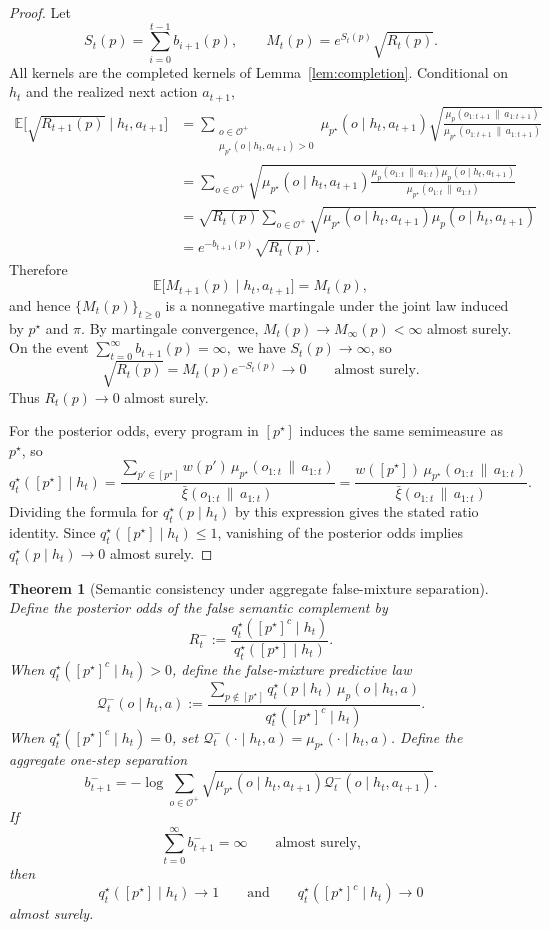\documentclass[11pt]{article}
\newtheorem{theorem}[definition]{Theorem}
\theoremstyle{remark}
\newcommand{\Ocal}{\mathcal{O}}
\newcommand{\Qcal}{\mathcal{Q}}
\newcommand{\E}{\mathbb{E}}
\newcommand{\givena}{\,\|\,}
\newcommand{\barxi}{\bar{\xi}}
\begin{document}
\begin{proof}
Let
\[
S_t(p) = \sum_{i=0}^{t-1} b_{i+1}(p),
\qquad
M_t(p) = e^{S_t(p)}\sqrt{R_t(p)}.
\]
All kernels are the completed kernels of Lemma~\ref{lem:completion}. Conditional on \(h_t\) and the realized next action \(a_{t+1}\),
\begin{align*}
\E\bigl[\sqrt{R_{t+1}(p)} \mid h_t,a_{t+1}\bigr]
&=
\sum_{\substack{o \in \Ocal^+\\
\mu_{p^\star}(o\mid h_t,a_{t+1})>0}}
\mu_{p^\star}(o\mid h_t,a_{t+1})
\sqrt{
\frac{\mu_p(o_{1:t+1}\givena a_{1:t+1})}
{\mu_{p^\star}(o_{1:t+1}\givena a_{1:t+1})}
} \\
&=
\sum_{o \in \Ocal^+}
\sqrt{
\mu_{p^\star}(o\mid h_t,a_{t+1})
\frac{
\mu_p(o_{1:t}\givena a_{1:t})
\mu_p(o\mid h_t,a_{t+1})
}{
\mu_{p^\star}(o_{1:t}\givena a_{1:t})
}
} \\
&=
\sqrt{R_t(p)}
\sum_{o \in \Ocal^+}
\sqrt{
\mu_{p^\star}(o\mid h_t,a_{t+1})
\mu_p(o\mid h_t,a_{t+1})
} \\
&=
e^{-b_{t+1}(p)}\sqrt{R_t(p)}.
\end{align*}
Therefore
\[
\E\bigl[M_{t+1}(p)\mid h_t,a_{t+1}\bigr]
= M_t(p),
\]
and hence \(\{M_t(p)\}_{t\ge0}\) is a nonnegative martingale under the joint law induced by \(p^\star\) and \(\pi\). By martingale convergence, \(M_t(p)\to M_\infty(p)<\infty\) almost surely. On the event
\(
\sum_{t=0}^{\infty} b_{t+1}(p)=\infty,
\)
we have \(S_t(p)\to\infty\), so
\[
\sqrt{R_t(p)} = M_t(p)e^{-S_t(p)} \to 0
\qquad\text{almost surely.}
\]
Thus \(R_t(p)\to 0\) almost surely.

For the posterior odds, every program in \([p^\star]\) induces the same semimeasure as \(p^\star\), so
\[
q_t^\star([p^\star]\mid h_t)
=
\frac{
\sum_{p' \in [p^\star]} w(p')\,\mu_{p^\star}(o_{1:t}\givena a_{1:t})
}{
\barxi(o_{1:t}\givena a_{1:t})
}
=
\frac{
w([p^\star])\,\mu_{p^\star}(o_{1:t}\givena a_{1:t})
}{
\barxi(o_{1:t}\givena a_{1:t})
}.
\]
Dividing the formula for \(q_t^\star(p\mid h_t)\) by this expression gives the stated ratio identity. Since \(q_t^\star([p^\star]\mid h_t)\le 1\), vanishing of the posterior odds implies \(q_t^\star(p\mid h_t)\to 0\) almost surely.
\end{proof}

\begin{theorem}[Semantic consistency under aggregate false-mixture separation]
\label{thm:semantic-consistency}
Define the posterior odds of the false semantic complement by
\[
R_t^-
:=
\frac{q_t^\star([p^\star]^c\mid h_t)}
{q_t^\star([p^\star]\mid h_t)}.
\]
When \(q_t^\star([p^\star]^c\mid h_t)>0\), define the false-mixture predictive law
\[
\Qcal_t^-(o\mid h_t,a)
:=
\frac{
\sum_{p \notin [p^\star]} q_t^\star(p\mid h_t)\,\mu_p(o\mid h_t,a)
}{
q_t^\star([p^\star]^c\mid h_t)
}.
\]
When \(q_t^\star([p^\star]^c\mid h_t)=0\), set \(\Qcal_t^-(\cdot\mid h_t,a)=\mu_{p^\star}(\cdot\mid h_t,a)\). Define the aggregate one-step separation
\[
b_{t+1}^-
=
-\log \sum_{o \in \Ocal^+}
\sqrt{
\mu_{p^\star}(o\mid h_t,a_{t+1})
\Qcal_t^-(o\mid h_t,a_{t+1})
}.
\]
If
\[
\sum_{t=0}^{\infty} b_{t+1}^- = \infty
\qquad\text{almost surely,}
\]
then
\[
q_t^\star([p^\star]\mid h_t)\to 1
\qquad\text{and}\qquad
q_t^\star([p^\star]^c\mid h_t)\to 0
\]
almost surely.
\end{theorem}
\end{document}
